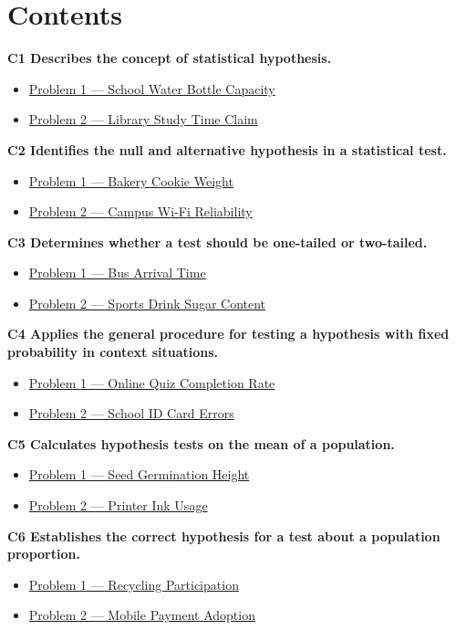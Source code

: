 


	
	\section*{Contents}
	\noindent\textbf{C1 Describes the concept of statistical hypothesis.}
	\begin{itemize}
		\item \hyperlink{c1-ex1}{Problem 1 — School Water Bottle Capacity}
		\item \hyperlink{c1-ex2}{Problem 2 — Library Study Time Claim}
	\end{itemize}
	\noindent\textbf{C2 Identifies the null and alternative hypothesis in a statistical test.}
	\begin{itemize}
		\item \hyperlink{c2-ex1}{Problem 1 — Bakery Cookie Weight}
		\item \hyperlink{c2-ex2}{Problem 2 — Campus Wi-Fi Reliability}
	\end{itemize}
	\noindent\textbf{C3 Determines whether a test should be one-tailed or two-tailed.}
	\begin{itemize}
		\item \hyperlink{c3-ex1}{Problem 1 — Bus Arrival Time}
		\item \hyperlink{c3-ex2}{Problem 2 — Sports Drink Sugar Content}
	\end{itemize}
	\noindent\textbf{C4 Applies the general procedure for testing a hypothesis with fixed probability in context situations.}
	\begin{itemize}
		\item \hyperlink{c4-ex1}{Problem 1 — Online Quiz Completion Rate}
		\item \hyperlink{c4-ex2}{Problem 2 — School ID Card Errors}
	\end{itemize}
	\noindent\textbf{C5 Calculates hypothesis tests on the mean of a population.}
	\begin{itemize}
		\item \hyperlink{c5-ex1}{Problem 1 — Seed Germination Height}
		\item \hyperlink{c5-ex2}{Problem 2 — Printer Ink Usage}
	\end{itemize}
	\noindent\textbf{C6 Establishes the correct hypothesis for a test about a population proportion.}
	\begin{itemize}
		\item \hyperlink{c6-ex1}{Problem 1 — Recycling Participation}
		\item \hyperlink{c6-ex2}{Problem 2 — Mobile Payment Adoption}
	\end{itemize}
